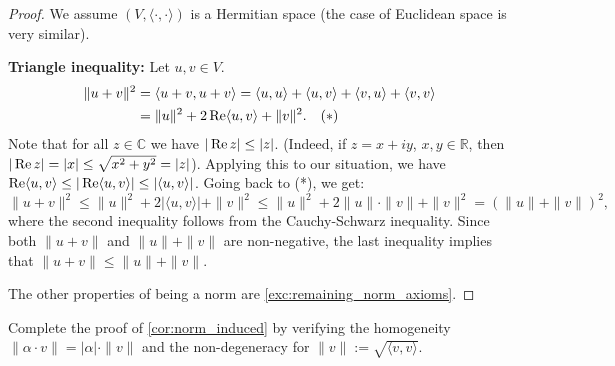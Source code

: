 \begin{proof}
    We assume $(V, \langle \cdot, \cdot \rangle)$ is a Hermitian space (the case of Euclidean space is very similar).
    
    \textbf{Triangle inequality:} Let $u, v \in V$.
    \begin{align*}
        \|u + v\|^2 &= \langle u + v, u + v \rangle = \langle u, u \rangle + \langle u, v \rangle + \langle v, u \rangle + \langle v, v \rangle \\
        &= \|u\|^2 + 2 \operatorname{Re} \langle u, v \rangle + \|v\|^2. \quad (*)
    \end{align*}
    Note that for all $z \in \mathbb{C}$ we have $|\operatorname{Re} z| \leq |z|$. (Indeed, if $z = x + iy$, $x, y \in \mathbb{R}$, then $|\operatorname{Re} z| = |x| \leq \sqrt{x^2 + y^2} = |z|$).
    Applying this to our situation, we have $\operatorname{Re} \langle u, v \rangle \leq |\operatorname{Re} \langle u, v \rangle| \leq |\langle u, v \rangle|$.
    Going back to (*), we get:
    \[
        \|u + v\|^2 \leq \|u\|^2 + 2 |\langle u, v \rangle| + \|v\|^2 \leq \|u\|^2 + 2 \|u\| \cdot \|v\| + \|v\|^2 = (\|u\| + \|v\|)^2,
    \]
    where the second inequality follows from the Cauchy-Schwarz inequality.
    Since both $\|u + v\|$ and $\|u\| + \|v\|$ are non-negative, the last inequality implies that $\|u + v\| \leq \|u\| + \|v\|$.

    The other properties of being a norm are \cref{exc:remaining_norm_axioms}.
\end{proof}

\begin{exercise}
    \label{exc:remaining_norm_axioms}
    Complete the proof of \cref{cor:norm_induced} by verifying the homogeneity $\|\alpha \cdot v\| = |\alpha| \cdot \|v\|$ and the non-degeneracy  for $\|v\| := \sqrt{\langle v, v \rangle}$.
\end{exercise}

